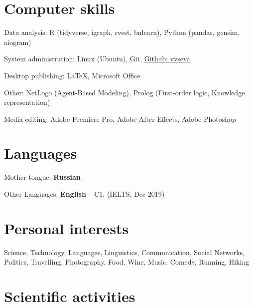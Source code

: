 \documentclass[a4paper, extended]{adcv}
\begin{document}



  \section{Computer skills}

  Data analysis: R (tidyverse, igraph, rvest, bnlearn), Python (pandas, gensim, aiogram)

  System administration: Linux (Ubuntu), Git, \href{https://github.com/vvseva/}{Github: vvseva}

  Desktop publishing: \LaTeX, Microsoft Office
  
  Other: NetLogo (Agent-Based Modeling), Prolog (First-order logic, Knowledge representation)
  
  Media editing: Adobe Premiere Pro, Adobe After Effects, Adobe Photoshop 
\fi

\section{Languages}

Mother tongue: \textbf{Russian} 

Other Languages: \textbf{English} -- C1, (IELTS, Dec 2019)

\ifextended
  \section{Personal interests}

  Science, Technology, Languages, Linguistics, Communication, Social Networks, Politics, Travelling, Photography, Food, Wine, Music, Comedy, Running, Hiking
\fi

\section{Scientific activities}\label{sec:publications}

\ifextended
  \begin{refsection}
  
    \nocite{musabirov_teaching_2020}
    \nocite{marchenko_analysis_2018}
    \nocite{suschevskiy_network_2018}
    
    \printbibliography[title={Publications}, heading=subbibliography]
  \end{refsection}
\end{document}

